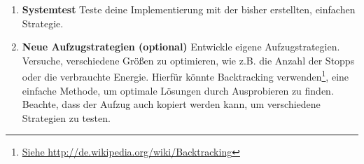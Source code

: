 \begin{enumerate}
\begin{algorithm}[H]
{   Move Elevator to next floor; \\
   Let all arrived people off; \\
   Let all people on floor into Elevator;\\
 }
\end{algorithm}

\item \textbf{Systemtest} 
Teste deine Implementierung mit der bisher erstellten, einfachen Strategie.

\item \textbf{Neue Aufzugstrategien (optional)}
Entwickle eigene Aufzugstrategien. 
Versuche, verschiedene Größen zu optimieren, wie z.B. die Anzahl der Stopps oder die verbrauchte Energie.
Hierfür könnte Backtracking verwenden\footnote{\url{Siehe http://de.wikipedia.org/wiki/Backtracking}}, eine einfache Methode, um optimale Lösungen durch Ausprobieren zu finden. Beachte, dass der Aufzug auch kopiert werden kann, um verschiedene Strategien zu testen.

\end{enumerate}


